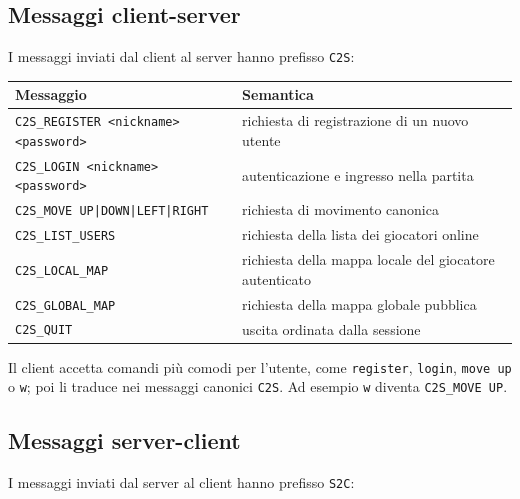 \documentclass[11pt,a4paper]{article}
\begin{document}
\subsection{Messaggi client-server}

I messaggi inviati dal client al server hanno prefisso \texttt{C2S}:

\begin{center}
\begin{tabular}{p{} p{}}
\toprule
\textbf{Messaggio} & \textbf{Semantica} \\
\midrule
\texttt{C2S\_REGISTER <nickname> <password>} & richiesta di registrazione di un nuovo utente \\
\texttt{C2S\_LOGIN <nickname> <password>} & autenticazione e ingresso nella partita \\
\texttt{C2S\_MOVE UP|DOWN|LEFT|RIGHT} & richiesta di movimento canonica \\
\texttt{C2S\_LIST\_USERS} & richiesta della lista dei giocatori online \\
\texttt{C2S\_LOCAL\_MAP} & richiesta della mappa locale del giocatore autenticato \\
\texttt{C2S\_GLOBAL\_MAP} & richiesta della mappa globale pubblica \\
\texttt{C2S\_QUIT} & uscita ordinata dalla sessione \\
\bottomrule
\end{tabular}
\end{center}

Il client accetta comandi più comodi per l'utente, come \texttt{register},
\texttt{login}, \texttt{move up} o \texttt{w}; poi li traduce nei messaggi
canonici \texttt{C2S}. Ad esempio \texttt{w} diventa
\texttt{C2S\_MOVE UP}.

\subsection{Messaggi server-client}

I messaggi inviati dal server al client hanno prefisso \texttt{S2C}:
\end{document}
